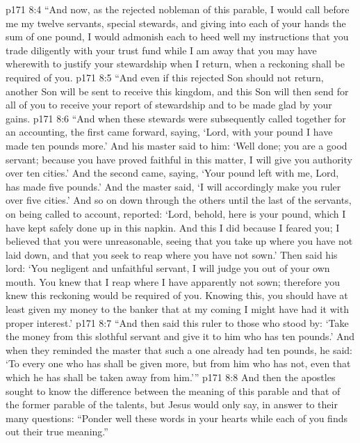 \vs p171 8:4 \textcolor{ubdarkred}{“And now, as the rejected nobleman of this parable, I would call before me my twelve servants, special stewards, and giving into each of your hands the sum of one pound, I would admonish each to heed well my instructions that you trade diligently with your trust fund while I am away that you may have wherewith to justify your stewardship when I return, when a reckoning shall be required of you.}
\vs p171 8:5 \textcolor{ubdarkred}{“And even if this rejected Son should not return, another Son will be sent to receive this kingdom, and this Son will then send for all of you to receive your report of stewardship and to be made glad by your gains.}
\vs p171 8:6 \textcolor{ubdarkred}{“And when these stewards were subsequently called together for an accounting, the first came forward, saying, ‘Lord, with your pound I have made ten pounds more.’ And his master said to him: ‘Well done; you are a good servant; because you have proved faithful in this matter, I will give you authority over ten cities.’ And the second came, saying, ‘Your pound left with me, Lord, has made five pounds.’ And the master said, ‘I will accordingly make you ruler over five cities.’ And so on down through the others until the last of the servants, on being called to account, reported: ‘Lord, behold, here is your pound, which I have kept safely done up in this napkin. And this I did because I feared you; I believed that you were unreasonable, seeing that you take up where you have not laid down, and that you seek to reap where you have not sown.’ Then said his lord: ‘You negligent and unfaithful servant, I will judge you out of your own mouth. You knew that I reap where I have apparently not sown; therefore you knew this reckoning would be required of you. Knowing this, you should have at least given my money to the banker that at my coming I might have had it with proper interest.’}
\vs p171 8:7 \textcolor{ubdarkred}{“And then said this ruler to those who stood by: ‘Take the money from this slothful servant and give it to him who has ten pounds.’ And when they reminded the master that such a one already had ten pounds, he said: ‘To every one who has shall be given more, but from him who has not, even that which he has shall be taken away from him.’”}
\vs p171 8:8 \pc And then the apostles sought to know the difference between the meaning of this parable and that of the former parable of the talents, but Jesus would only say, in answer to their many questions: \textcolor{ubdarkred}{“Ponder well these words in your hearts while each of you finds out their true meaning.”}
